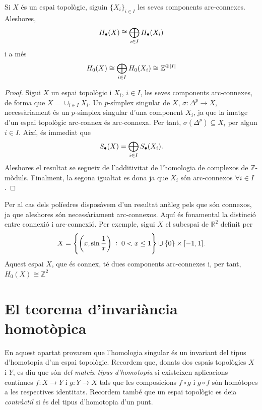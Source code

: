 \documentclass[../main.tex]{subfiles}
\begin{document}
\begin{prop}
Si $X$ és un espai topològic, siguin $\{X_i\}_{i\in I}$ les seves components arc-connexes. Aleshores, 
\begin{equation}
    \notag
    H_\bullet(X) \cong \bigoplus_{i\in I}H_\bullet(X_i)
\end{equation}
i a més
\begin{equation}
    \notag
    H_0(X)\cong \bigoplus_{i\in I}H_0(X_i)\cong \mathbb{Z}^{\oplus|I|}
\end{equation}
\end{prop}
\begin{proof}
Sigui $X$ un espai topològic i $X_i$, $i\in I$, les seves components arc-connexes, de forma que $X = \cup_{i\in I} X_i$. Un $p$-símplex singular de $X$, $\sigma:\Delta^p\rightarrow X$, necessàriament és un $p$-símplex singular d'una component $X_i$, ja que la imatge d'un espai topològic arc-connex és arc-connexa. Per tant, $\sigma(\Delta^p)\subseteq X_i$ per algun $i\in I$. Així, és immediat que
\begin{equation}
    \notag
    S_\bullet(X)= \bigoplus_{i\in I}S_\bullet(X_i).
\end{equation}
Aleshores el resultat se segueix de l'additivitat de l'homologia de complexos de $\mathbb{Z}$-mòduls. Finalment, la segona igualtat es dona ja que $X_i$ són arc-connexos $\forall i\in I$.
\end{proof}


Per al cas dels políedres disposàvem d'un resultat anàleg pels que són connexos, ja que aleshores són necessàriament arc-connexos. Aquí és fonamental la distinció entre connexió i arc-connexió. Per exemple, sigui $X$ el subespai de $\mathbb{R}^2$ definit per
\begin{equation}
    \notag
    X = \left\{\left(x,\sin\frac{1}{x}\right)\;:\;0<x\leq 1\right\}\cup\{0\}\times[-1,1].
\end{equation}
Aquest espai $X$, que és connex, té dues components arc-connexes i, per tant, $H_0(X)\cong \mathbb{Z}^2$


\section{El teorema d'invariància homotòpica}

En aquest apartat provarem que l'homologia singular és un invariant del tipus d'homotopia d'un espai topològic. Recordem que, donats dos espais topològics $X$ i $Y$, es diu que són \textit{del mateix tipus d'homotopia} si existeixen aplicacions contínues $f:X\rightarrow Y$ i $g:Y\rightarrow X$ tals que les composicions $f\circ g$ i $g\circ f$ són homòtopes a les respectives identitats. Recordem també que un espai topològic es deia \textit{contràctil} si és del tipus d'homotopia d'un punt.
\end{document}
